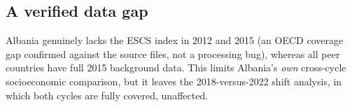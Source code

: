 \subsection{A verified data gap}
Albania genuinely lacks the ESCS index in 2012 and 2015 (an OECD coverage gap
confirmed against the source files, not a processing bug), whereas all peer countries
have full 2015 background data. This limits Albania's \emph{own} cross-cycle
socioeconomic comparison, but it leaves the 2018-versus-2022 shift analysis, in which
both cycles are fully covered, unaffected.
